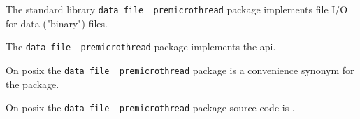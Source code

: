 
The standard library {\tt data\_file\_\_premicrothread} package implements file I/O for data ("binary") files.

The {\tt data\_file\_\_premicrothread} package implements the  api.

On posix the {\tt data\_file\_\_premicrothread} package is a convenience synonym for the  package.

On posix the {\tt data\_file\_\_premicrothread} package source code is .

